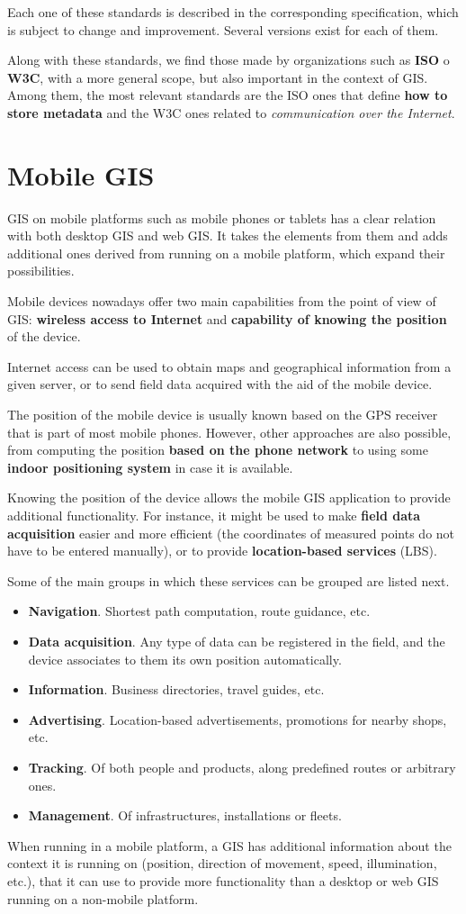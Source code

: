 Each one of these standards is described in the corresponding specification, which is subject to change and improvement. Several versions exist for each of them.

Along with these standards, we find those made by organizations such as \textbf{ISO} o \textbf{W3C}, with a more general scope, but also important in the context of GIS. Among them, the most relevant standards are the ISO ones that define \textbf{how to store metadata} and the W3C ones related to \emph{communication over the Internet}.

\section{Mobile GIS}

GIS on mobile platforms such as mobile phones or tablets has a clear relation with both desktop GIS and web GIS. It takes the elements from them and adds  additional ones derived from running on a mobile platform, which expand their possibilities.

Mobile devices nowadays offer two main capabilities from the point of view of GIS: \textbf{wireless access to Internet} and \textbf{capability of knowing the position} of the device. 

Internet access can be used to obtain maps and geographical information from a given server, or to send field data acquired with the aid of the mobile device.

The position of the mobile device is usually known based on the GPS receiver that is part of most mobile phones. However, other approaches are also possible, from computing the position \textbf{based on the phone network} to using some \textbf{indoor positioning system} in case it is available.

Knowing the position of the device allows the mobile GIS application to provide additional functionality. For instance, it might be used to make \textbf{field data acquisition} easier and more efficient (the coordinates of measured points do not have to be entered manually), or to provide \textbf{location-based services} (LBS).  

Some of the main groups in which these services can be grouped are listed next.

\begin{itemize}
	\item \textbf{Navigation}. Shortest path computation, route guidance, etc.
\item \textbf{Data acquisition}. Any type of data can be registered in the field, and the device associates to them its own position automatically.
\item \textbf{Information}. Business directories, travel guides, etc.
\item \textbf{Advertising}. Location-based advertisements, promotions for nearby shops, etc.
\item \textbf{Tracking}. Of both people and products, along predefined routes or arbitrary ones.
\item \textbf{Management}. Of infrastructures, installations or fleets.
\end{itemize}

When running in a mobile platform, a GIS has additional information about the context it is running on (position, direction of movement, speed, illumination, etc.), that it can use to provide more functionality than a desktop or web GIS running on a non-mobile platform.

\pagestyle{empty}
